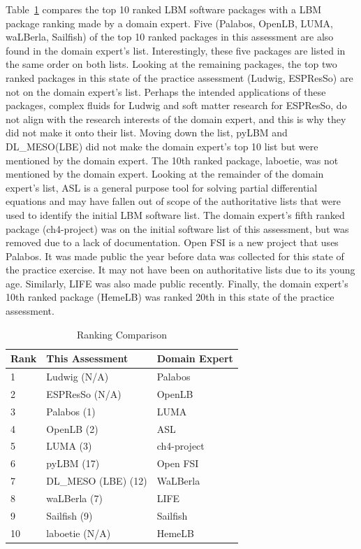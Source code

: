 \documentclass[final, 3p, times, authoryear]{elsarticle}
\begin{document}
Table~\ref{rankingcomparison} compares the top 10 ranked LBM software packages
with a LBM package ranking made by a domain expert. Five (Palabos, OpenLB, LUMA,
waLBerla, Sailfish) of the top 10 ranked packages in this assessment are also
found in the domain expert's list. Interestingly, these five packages are listed
in the same order on both lists. Looking at the remaining packages, the top two
ranked packages in this state of the practice assessment (Ludwig, ESPResSo) are
not on the domain expert's list. Perhaps the intended applications of these
packages, complex fluids for Ludwig and soft matter research for ESPResSo, do
not align with the research interests of the domain expert, and this is why they
did not make it onto their list. Moving down the list, pyLBM and DL\_MESO(LBE)
did not make the domain expert's top 10 list but were mentioned by the domain
expert. The 10th ranked package, laboetie, was not mentioned by the domain
expert. Looking at the remainder of the domain expert's list, ASL is a general
purpose tool for solving partial differential equations and may have fallen out
of scope of the authoritative lists that were used to identify the initial LBM
software list. The domain expert's fifth ranked package (ch4-project) was on the
initial software list of this assessment, but was removed due to a lack of
documentation. Open FSI is a new project that uses Palabos. It was made public
the year before data was collected for this state of the practice exercise. It
may not have been on authoritative lists due to its young age. Similarly, LIFE
was also made public recently. Finally, the domain expert's 10th ranked package
(HemeLB) was ranked 20th in this state of the practice assessment. 

\begin{table}
\begin{center}
	\begin{tabular}{ p{2cm}p{4.5cm}p{3.5cm}}
		\toprule
		Rank & This Assessment & Domain Expert\\
		\midrule
		1 & Ludwig (N/A) & Palabos\\
		2 & ESPResSo (N/A) & OpenLB\\
		3 & Palabos (1)& LUMA\\
		4 & OpenLB (2)& ASL\\
		5 & LUMA (3)& ch4-project\\
		6 & pyLBM (17)& Open FSI\\
		7 & DL\_MESO (LBE) (12)& WaLBerla\\
		8 & waLBerla (7)& LIFE\\
		9 & Sailfish (9)& Sailfish\\
		10 & laboetie (N/A)& HemeLB\\		
		\bottomrule
	\end{tabular}
	\caption{Ranking Comparison} \label{rankingcomparison}
\end{center}
\end{table}
\end{document}
